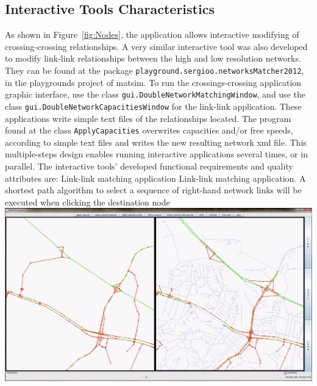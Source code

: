 \subsection{Interactive Tools Characteristics}
As shown in Figure~\ref{fig:Nodes}, the application allows interactive modifying of crossing-crossing relationships. A very similar interactive tool was also developed to  modify link-link relationships between the high and low resolution networks. They can be found at the package \lstinline|playground.sergioo.networksMatcher2012|, in the playgrounds project of \gls{matsim}. To run the crossings-crossing application graphic interface, use the class \lstinline|gui.DoubleNetworkMatchingWindow|, and use the class \lstinline|gui.DoubleNetworkCapacitiesWindow| for the link-link application. These applications write simple text files of the relationships located. The program found at the class \lstinline|ApplyCapacities| overwrites capacities and/or free speeds, according to simple text files and writes the new resulting network \gls{xml} file. This multiple-steps design enables running interactive applications several times, or in parallel. The interactive tools' developed functional requirements and quality attributes are:
%
\createfigure
{Link-link matching application}
{Link-link matching application. A shortest path algorithm to select a sequence of right-hand network links will be executed when clicking the destination node}
{\label{fig:Links}}
{\includegraphics[width=1.0\textwidth]{extending/figures/netEdSing/Links.png}}
{}

